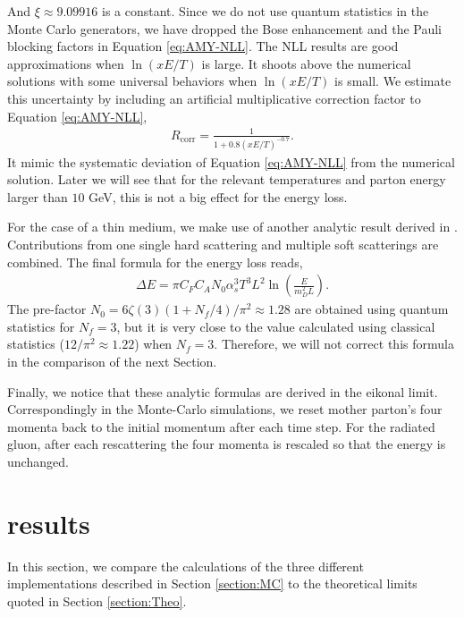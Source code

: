 \documentclass[aps, prc, reprint, amsmath, groupedaddress, nofootinbib]{revtex4-1}
\begin{document}
And $\xi\approx9.09916$ is a constant. Since we do not use quantum statistics in the Monte Carlo generators, we have dropped the Bose enhancement and the Pauli blocking factors in Equation \ref{eq:AMY-NLL}.
The NLL results are good approximations when $\ln(xE/T)$ is large. 
It shoots above the numerical solutions with some universal behaviors when $\ln(xE/T)$ is small.
We estimate this uncertainty by including an artificial multiplicative correction factor to Equation \ref{eq:AMY-NLL}, 
\begin{eqnarray}\label{eq:correction}
R_{\textrm{corr}} = \frac{1}{1+0.8\left(xE/T\right)^{-0.7}}.
\end{eqnarray}
It mimic the systematic deviation of Equation \ref{eq:AMY-NLL} from the numerical solution. 
Later we will see that for the relevant temperatures and parton energy larger than $10$ GeV, this is not a big effect for the energy loss.

For the case of a thin medium, we make use of another analytic result derived in \cite{Arnold:2009mr}. 
Contributions from one single hard scattering and multiple soft scatterings are combined. The final formula for the energy loss reads,
\begin{eqnarray}\label{eq:dE-thin}
\Delta E = \pi C_F C_A N_0 \alpha_s^3 T^3 L^2 \ln\left(\frac{E}{m_D^2 L}\right).
\end{eqnarray}
The pre-factor $N_0 = 6\zeta(3)(1+N_f/4)/\pi^2 \approx 1.28$ 
are obtained using quantum statistics for $N_f=3$, but it is very close to the value calculated using classical statistics ($12/\pi^2 \approx 1.22$) when $N_f=3$.
Therefore, we will not correct this formula in the comparison of the next Section.

Finally, we notice that these analytic formulas are derived in the eikonal limit. 
Correspondingly in the Monte-Carlo simulations, we reset mother parton's four momenta back to the initial momentum after each time step. 
For the radiated gluon, after each rescattering the four momenta is rescaled so that the energy is unchanged.


\section{results}\label{section:results}
In this section, we compare the calculations of the three different implementations described in Section \ref{section:MC} to the theoretical limits quoted in Section \ref{section:Theo}. 
\end{document}
